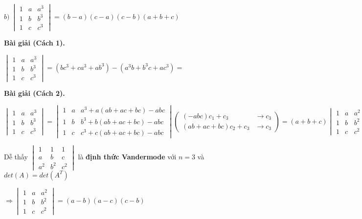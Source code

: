 \documentclass[12pt]{report}
\begin{document}
$b)\ \begin{vmatrix}
	1 & a & a^3 \\
	1 & b & b^3 \\
	1 & c & c^3
\end{vmatrix}
= (b-a)(c-a)(c-b)(a+b+c)$

\textbf{Bài giải (Cách 1).}

$\begin{vmatrix}
1 & a & a^3 \\
1 & b & b^3 \\
1 & c & c^3
\end{vmatrix} = (bc^3+ca^3+ab^3) - (a^3b+b^3c+ac^3) = $

\textbf{Bài giải (Cách 2). }

$\begin{vmatrix}
	1 & a & a^3 \\
	1 & b & b^3 \\
	1 & c & c^3
\end{vmatrix} = \begin{vmatrix}
	1 & a & a^3 + a(ab + ac + bc) - abc\\
	1 & b & b^3 + b(ab + ac + bc) - abc\\
	1 & c & c^3 + c(ab + ac + bc) - abc
\end{vmatrix} \left( \begin{smallmatrix}
	(-abc)c_1 + c_3 &\to c_3\\
	(ab + ac + bc)c_2 + c_3 &\to c_3 
\end{smallmatrix}\right) = (a + b + c)\begin{vmatrix}
	1 & a & a^2 \\
	1 & b & b^2 \\
	1 & c & c^2
\end{vmatrix}$

Dễ thấy $\begin{vmatrix}
	1 & 1 & 1 \\
	a & b & c \\
	a^2 & b^2 & c^2
\end{vmatrix}$ là \textbf{định thức Vandermode} với $n = 3$ và $det(A) = det(A^T)$

$\Rightarrow \begin{vmatrix}
	1 & a & a^2 \\
	1 & b & b^2 \\
	1 & c & c^2
\end{vmatrix} = (a-b)(a-c)(c-b)$
\end{document}
